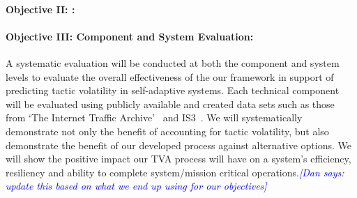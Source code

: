 \documentclass[12pt]{article}
\newcommand{\dan}[1]{\textcolor{blue}{{\it [Dan says: #1]}}}
\begin{document}



% 











% 






\vspace{-0mm}\paragraph{Objective II: :} 



\vspace{-0mm}\paragraph{Objective III: Component and System Evaluation:}  A systematic evaluation will be conducted at both the component and system levels to evaluate the overall effectiveness of the our framework in support of predicting tactic volatility in self-adaptive systems. Each technical component will be evaluated using publicly available and created data sets such as those from `The Internet Traffic Archive'~\cite{traffic_Archive_URL} and IS3~\cite{is3_website}. We will systematically demonstrate not only the benefit of accounting for tactic volatility, but also demonstrate the benefit of our developed process against alternative options. We will show the positive impact our TVA process will have on a system's efficiency, resiliency and ability to complete system/mission critical operations.\dan{update this based on what we end up using for our objectives}
\end{document}
